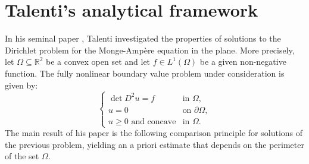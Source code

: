 \documentclass{article}
\numberwithin{equation}{section}
\begin{document}
\section{Talenti's analytical framework}

In his seminal paper \cite{talenti1981}, Talenti investigated the properties of solutions to the Dirichlet problem for the Monge-Ampère equation in the plane. More precisely, let $\Omega \subseteq \mathbb{R}^2$ be a convex open set and let $f\in L^1(\Omega)$ be a given non-negative function. The fully nonlinear boundary value problem under consideration is given by:
\begin{equation}\label{eq:dirichlet_ma}
\begin{cases} 
\det D^2u = f & \text{in } \Omega, \\ 
u = 0 & \text{on } \partial \Omega, \\
u \geq 0 \text{ and concave} & \text{in } \Omega.
\end{cases}
\end{equation}
\noindent The main result of his paper is the following comparison principle for solutions of the previous problem, yielding an a priori estimate that depends on the perimeter of the set $\Omega$. 
\end{document}
